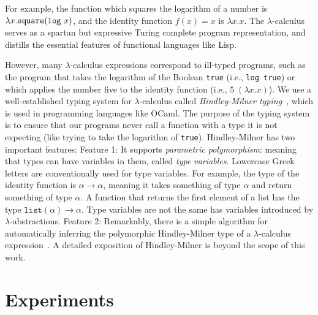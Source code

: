 \documentclass{article}
\begin{document}
For example, the function which squares the logarithm of a number is
$\lambda x.\text{\texttt{square}} (\text{\texttt{log} } x)$, and the identity function $f(x) = x$ is $\lambda x.x$. The
$\lambda$-calculus serves as a spartan but expressive Turing complete
program representation, and distills the essential features of functional languages like Lisp.

However, many $\lambda$-calculus expressions correspond to ill-typed programs, such as the program that takes the logarithm of the Boolean \texttt{true} (i.e., \texttt{log true}) or which applies the number five to the identity function
(i.e., $5 \; (\lambda x.x)$).
We use a well-established typing system for $\lambda$-calculus called \emph{Hindley-Milner typing}~\cite{pierce}, which is used in programming languages like OCaml.
The purpose of the typing system is to ensure that our programs never call a function with a type it is not expecting (like trying to take the logarithm of \texttt{true}).
Hindley-Milner has two important features:
Feature 1: It supports \emph{parametric polymorphism}: meaning that types can have variables in them, called \emph{type variables}. Lowercase Greek letters are conventionally used for  type variables.
For example, the type of the identity function is $\alpha\to\alpha$, meaning it takes something of type $\alpha$ and return something of type $\alpha$. A function that returns the first element of a list has the type $\texttt{list}(\alpha)\to\alpha$. Type variables are not the same has variables introduced by $\lambda$-abstractions.
Feature 2: Remarkably, there is a  simple algorithm for automatically inferring the polymorphic Hindley-Milner type of a $\lambda$-calculus expression~\cite{damas1982principal}.
A detailed exposition of Hindley-Milner is beyond the scope of this work.




\section{Experiments}
\end{document}
